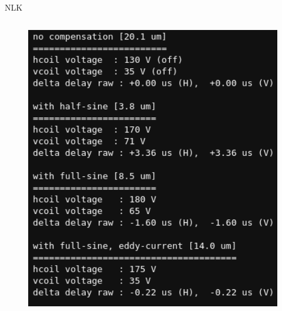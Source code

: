 \documentclass{beamer}					  %
\begin{document}
\begin{frame}{NLK}
\begin{columns}
\begin{column}{0.4\textwidth}
\begin{figure}[H]
                \includegraphics[width=1.0\textwidth]{2024-03-08/figures/hcoil-table.png} \hspace*{4cm}
                \label{fig:hcoil-table}
            \end{figure}
        \end{column}
    \end{columns}
\end{frame}
\end{document}
